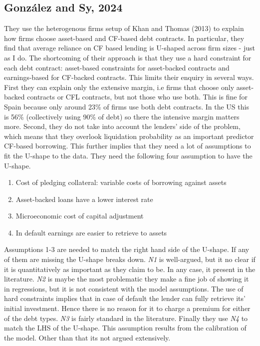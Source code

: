 \documentclass[12pt]{article}
\begin{document}
\subsection*{González and Sy, 2024 \checkmark}
They use the heterogenous firms setup of Khan and Thomas (2013) to explain how firms choose asset-based and CF-based debt contracts. In particular, they find that average reliance on CF based lending is U-shaped across firm sizes - just as I do. The shortcoming of their approach is that they use a hard constraint for each debt contract: asset-based constraints for asset-backed contracts and earnings-based for CF-backed contracts. This limits their enquiry in several ways. First they can explain only the extensive margin, i.e firms that choose only asset-backed contracts or CFL contracts, but not those who use both. This is fine for Spain because only around 23\% of firms use both debt contracts. In the US this is 56\% (collectively using 90\% of debt) so there the intensive margin matters more. Second, they do not take into account the lenders' side of the problem, which means that they overlook liquidation probability as an important predictor CF-based borrowing. This further implies that they need a lot of assumptions to fit the U-shape to the data. They need the following four assumption to have the U-shape. 
\begin{enumerate} \setlength\itemsep{0em} 
    \item Cost of pledging collateral: variable costs of borrowing against assets
    \item Asset-backed loans have a lower interest rate 
    \item Microeconomic cost of capital adjustment
    \item In default earnings are easier to retrieve to assets
\end{enumerate}
Assumptions 1-3 are needed to match the right hand side of the U-shape. If any of them are missing the U-shape breaks down. \textit{N1} is well-argued, but it no clear if it is quantitatively as important as they claim to be. In any case, it present in the literature. \textit{N2} is maybe the most problematic they make a fine job of showing it in regressions, but it is not consistent with the model assumptions. The use of hard constraints implies that in case of default the lender can fully retrieve its' initial investment. Hence there is no reason for it to charge a premium for either of the debt types. \textit{N3} is fairly standard in the literature. Finally they use \textit{N4} to match the LHS of the U-shape. This assumption results from the calibration of the model. Other than that its not argued extensively. \vspace{3mm} \\
\end{document}
